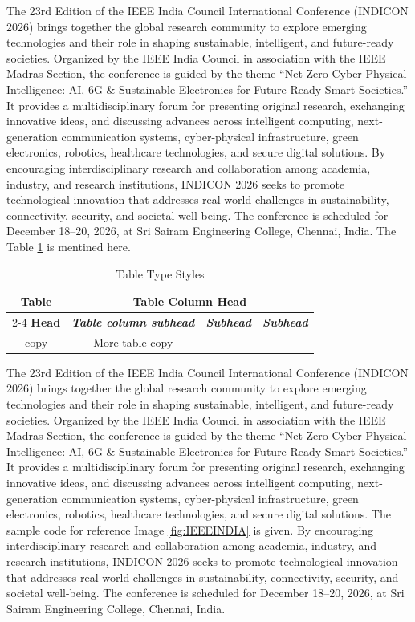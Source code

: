 \documentclass[conference]{IEEEtran}
\begin{document}
The 23rd Edition of the IEEE India Council International Conference (INDICON 2026) brings together the global research community to explore emerging technologies and their role in shaping sustainable, intelligent, and future-ready societies. Organized by the IEEE India Council in association with the IEEE Madras Section, the conference is guided by the theme “Net-Zero Cyber-Physical Intelligence: AI, 6G \& Sustainable Electronics for Future-Ready Smart Societies.” It provides a multidisciplinary forum for presenting original research, exchanging innovative ideas, and discussing advances across intelligent computing, next-generation communication systems, cyber-physical infrastructure, green electronics, robotics, healthcare technologies, and secure digital solutions. By encouraging interdisciplinary research and collaboration among academia, industry, and research institutions, INDICON 2026 seeks to promote technological innovation that addresses real-world challenges in sustainability, connectivity, security, and societal well-being. The conference is scheduled for December 18–20, 2026, at Sri Sairam Engineering College, Chennai, India. The Table \ref{tab:tab1} is mentined here.

\begin{table}[htbp]
\caption{Table Type Styles}
\begin{center}
\begin{tabular}{|c|c|c|c|}
\hline
\textbf{Table}&\multicolumn{3}{|c|}{\textbf{Table Column Head}} \\
\cline{2-4} 
\textbf{Head} & \textbf{\textit{Table column subhead}}& \textbf{\textit{Subhead}}& \textbf{\textit{Subhead}} \\
\hline
copy& More table copy& &  \\
\hline
\end{tabular}
\label{tab:tab1}
\end{center}
\end{table}


The 23rd Edition of the IEEE India Council International Conference (INDICON 2026) brings together the global research community to explore emerging technologies and their role in shaping sustainable, intelligent, and future-ready societies. Organized by the IEEE India Council in association with the IEEE Madras Section, the conference is guided by the theme “Net-Zero Cyber-Physical Intelligence: AI, 6G \& Sustainable Electronics for Future-Ready Smart Societies.” It provides a multidisciplinary forum for presenting original research, exchanging innovative ideas, and discussing advances across intelligent computing, next-generation communication systems, cyber-physical infrastructure, green electronics, robotics, healthcare technologies, and secure digital solutions.  The sample code for reference Image \ref{fig:IEEEINDIA} is given. By encouraging interdisciplinary research and collaboration among academia, industry, and research institutions, INDICON 2026 seeks to promote technological innovation that addresses real-world challenges in sustainability, connectivity, security, and societal well-being. The conference is scheduled for December 18–20, 2026, at Sri Sairam Engineering College, Chennai, India.
\end{document}
